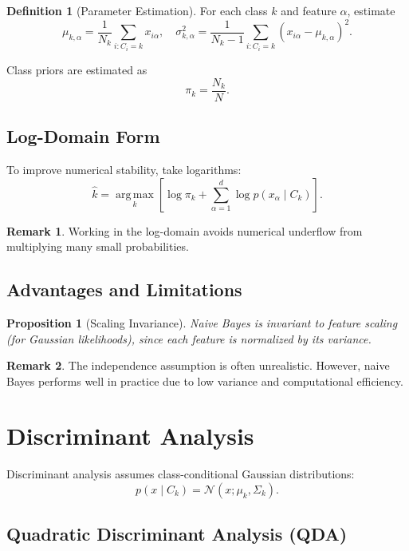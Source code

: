 \documentclass[12pt,oneside]{book}
\numberwithin{equation}{section}
\theoremstyle{definition}
\newtheorem{definition}{Definition}[section]
\newtheorem{remark}{Remark}[section]
\theoremstyle{plain}
\newtheorem{proposition}{Proposition}[section]
\theoremstyle{remark}
\newcommand{\argmax}{\operatorname*{arg\,max}}
\begin{document}
\begin{definition}[Parameter Estimation]
For each class $k$ and feature $\alpha$, estimate
\[
\mu_{k,\alpha}
=
\frac{1}{N_k}\sum_{i:C_i=k} x_{i\alpha},
\quad
\sigma_{k,\alpha}^2
=
\frac{1}{N_k-1}\sum_{i:C_i=k}(x_{i\alpha}-\mu_{k,\alpha})^2.
\]
\end{definition}

Class priors are estimated as
\[
\pi_k
=
\frac{N_k}{N}.
\]

\subsection{Log-Domain Form}

To improve numerical stability, take logarithms:
\[
\hat{k}
=
\argmax_k
\left[
\log \pi_k
+
\sum_{\alpha=1}^d
\log p(x_\alpha \mid C_k)
\right].
\]

\begin{remark}
Working in the log-domain avoids numerical underflow from multiplying many small probabilities.
\end{remark}

\subsection{Advantages and Limitations}

\begin{proposition}[Scaling Invariance]
Naive Bayes is invariant to feature scaling (for Gaussian likelihoods), since each feature is normalized by its variance.
\end{proposition}

\begin{remark}
The independence assumption is often unrealistic. However, naive Bayes performs well in practice due to low variance and computational efficiency.
\end{remark}

\section{Discriminant Analysis}

Discriminant analysis assumes class-conditional Gaussian distributions:
\[
p(x \mid C_k)
=
\mathcal{N}(x;\mu_k,\Sigma_k).
\]

\subsection{Quadratic Discriminant Analysis (QDA)}
\end{document}

